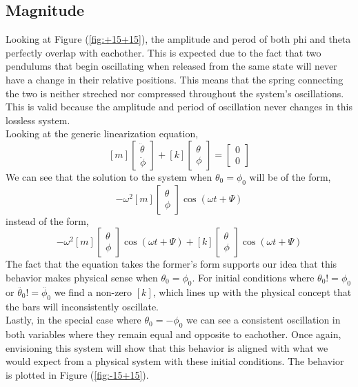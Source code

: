 \documentclass[12pt]{report}
\begin{document}
\begin{flushleft}
\subsection{Magnitude}
Looking at Figure (\ref{fig:+15+15}), the amplitude and perod of both phi and theta perfectly overlap with eachother. This is expected due to the fact that two pendulums that begin oscillating when released from the same state will never have a change in their relative positions. This means that the spring connecting the two is neither streched nor compressed throughout the system's oscillations. This is valid because the amplitude and period of oscillation never changes in this lossless system. \\
Looking at the generic linearization equation,
$$[m] \begin{bmatrix} \ddot{\theta}\\ \ddot{\phi} \end{bmatrix} +
[k] \begin{bmatrix} \theta \\ \phi \end{bmatrix} =
\begin{bmatrix} 0\\ 0 \end{bmatrix}$$
We can see that the solution to the system when $\theta_0 = \phi_0$ will be of the form,
$$-\omega^2[m] \begin{bmatrix} \theta\\ \phi \end{bmatrix} \cos(\omega t + \Psi)$$
instead of the form,
$$-\omega^2[m] \begin{bmatrix} \theta\\ \phi \end{bmatrix} \cos(\omega t + \Psi)
+  [k] \begin{bmatrix} \theta \\ \phi \end{bmatrix} \cos(\omega t + \Psi)$$
The fact that the equation takes the former's form supports our idea that this behavior makes physical sense when $\theta_0 = \phi_0$. For initial conditions where $\theta_0 != \phi_0$ or $\ddot{\theta_0} != \ddot{\phi_0}$ we find a non-zero $[k]$, which lines up with the physical concept that the bars will inconsistently oscillate. \\
Lastly, in the special case where $\theta_0 = -\phi_0$ we can see a consistent oscillation in both variables where they remain equal and opposite to eachother. Once again, envisioning this system will show that this behavior is aligned with what we would expect from a physical system with these initial conditions. The behavior is plotted in Figure (\ref{fig:-15+15}).

\end{flushleft}
\end{document}
